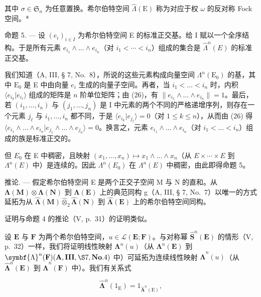 其中 \(\sigma \in \mathfrak{S}_n\) 为任意置换。希尔伯特空间 \(\hat{\Lambda}(\mathrm{E})\) 称为对应于权 \(\omega\) 的反对称 Fock 空间。*

命题 5. --- 设 \((e_i)_{i \in I}\) 为希尔伯特空间 E 的标准正交基。给 I 赋以一个全序结构。于是所有元素 \(e_{i_1} \wedge \ldots \wedge e_{i_n}\)（对 \(i_1 < \cdots < i_n\)）组成的集合是 \(\hat{\Lambda}^n(E)\) 的标准正交基。

我们知道（A, III, § 7, No.~8），所说的这些元素构成向量空间 \(\Lambda^n (\mathrm{E}_0)\) 的基，其中 \(\mathrm{E}_0\) 是 E 中由向量 \(e_i\) 生成的向量子空间。再者，当 \(i_1 < \dots < i_n\) 时，内积 \(\langle e_{i_k}|e_{i_\ell}\rangle\) 组成的矩阵是 \(n\) 阶单位矩阵；由 (26)，有 \(\| e_{i_1}\wedge \ldots \wedge e_{i_n}\| = 1\)。最后，若 \((i_1,\dots,i_n)\) 与 \((j_1,\dots,j_n)\) 是 I 中元素的两个不同的严格递增序列，则存在一个元素 \(j_\ell\) 与 \(i_1,\ldots ,i_n\) 都不同，于是 \(\langle e_{i_k}|e_{j_\ell}\rangle = 0\)（对 \(1\leqslant k\leqslant n\)），从而由 (26) 得 \(\langle e_{i_1}\wedge \ldots \wedge e_{i_n}|e_{j_1}\wedge \ldots \wedge e_{j_n}\rangle = 0\)。换言之，元素 \(e_{i_1}\wedge \ldots \wedge e_{i_n}\)（对 \(i_1 < \dots < i_n\)）组成的族是标准正交的。

但 \(E_{0}\) 在 E 中稠密，且映射 \((x_{1},...,x_{n})\mapsto x_{1}\wedge\ldots\wedge x_{n}\)（从 \(E\times\cdots\times E\) 到 \(\Lambda^{n}(E)\) 中）是连续的。因此 \(\Lambda^{n}(E_{0})\) 在 \(\Lambda^{n}(E)\) 中稠密，由此即得命题 5。

推论. --- 假定希尔伯特空间 E 是两个正交子空间 M 与 N 的直和。从 \(\symbf{\Lambda}(\mathbf{M})\otimes\symbf{\Lambda}(\mathbf{N})\) 到 \(\symbf{\Lambda}(\mathbf{E})\) 上的典范同构 g（A, III, § 7, No.~7）以唯一的方式延拓为从 \(\hat{\symbf{\Lambda}}(\mathbf{M})\hat{\otimes}_{2}\hat{\symbf{\Lambda}}(\mathbf{N})\) 到 \(\hat{\symbf{\Lambda}}(\mathbf{E})\) 上的希尔伯特空间同构。

证明与命题 4 的推论（V, p.~31）的证明类似。

设 \(\mathbf{E}\) 与 \(\mathbf{F}\) 为两个希尔伯特空间，\(u \in \mathcal{L}(\mathbf{E};\mathbf{F})\)。与对称幂 \(\hat{\mathbf{S}}^n (\mathbf{E})\) 的情形（V, p.~32）一样，我们将证明线性映射 \(\symbf{\Lambda}^n (u)\)（从 \(\symbf{\Lambda}^n (\mathbf{E})\) 到 \(\symbf{\Lambda}^n (\mathbf{F})(\mathbf{A},\mathbf{III},\S 7,\mathbf{No}.4)\) 中）可延拓为连续线性映射 \(\hat{\symbf{\Lambda}}^n (u)\)（从 \(\hat{\symbf{\Lambda}}^n (\mathbf{E})\) 到 \(\hat{\symbf{\Lambda}}^n (\mathbf{F})\) 中）。我们有关系式

\[
\hat {\symbf {\Lambda}} ^ {n} (1 _ {\mathrm{E}}) = 1 _ {\hat {\symbf {\Lambda}} ^ {n} (\mathrm{E})},\tag{27}
\]

